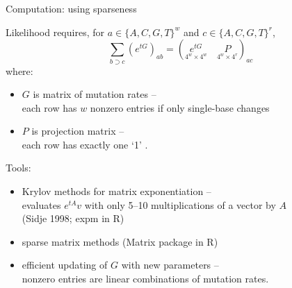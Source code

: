 \documentclass[smaller]{beamer}
\begin{document}
\begin{frame}{Computation: using sparseness}

  Likelihood requires, for $a \in \{A,C,G,T\}^w$ and $c \in \{A,C,G,T\}^r$,
  \[
  \sum_{b \supset c} \left( e^{tG} \right)_{ab} = ( \underset{\scriptstyle 4^w \times 4^w}{e^{tG}} \quad  \underset{\scriptstyle 4^w \times 4^r}{P} )_{ac} 
  \]
  where:
  \begin{itemize}
    \item $G$ is matrix of mutation rates --\\
      each row has $w$ nonzero entries if only single-base changes
    \item $P$ is projection matrix --\\
      each row has exactly one `1' .
  \end{itemize}

  {\struct Tools:} 
  \begin{itemize}

    \item Krylov methods for matrix exponentiation --\\
      evaluates $e^{tA} v$ with only 5--10 multiplications of a vector by $A$ \\
      {\aside (Sidje 1998; expm in R)}

    \item sparse matrix methods 
      {\aside (Matrix package in R)}

    \item efficient updating of $G$ with new parameters --\\
      nonzero entries are linear combinations of mutation rates.
    
  \end{itemize}

\end{frame}
\end{document}
